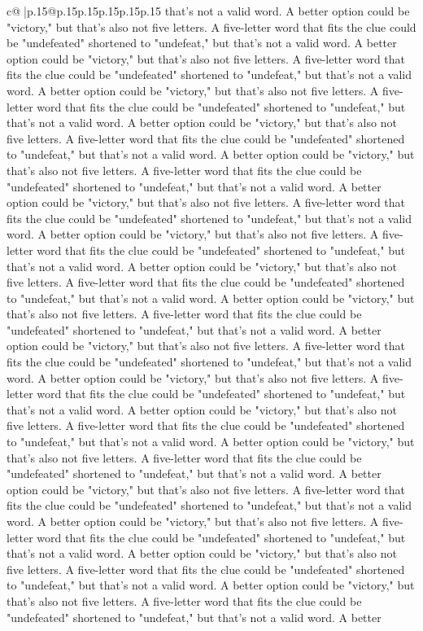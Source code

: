 \documentclass{article}
\begin{document}
{\begin{supertabular}{c@{$\;$}|p{.15\linewidth}@{}p{.15\linewidth}p{.15\linewidth}p{.15\linewidth}p{.15\linewidth}p{.15\linewidth}}
{{{that's not a valid word. A better option could be "victory," but that's also not five letters. A five{-}letter word that fits the clue could be "undefeated" shortened to "undefeat," but that's not a valid word. A better option could be "victory," but that's also not five letters. A five{-}letter word that fits the clue could be "undefeated" shortened to "undefeat," but that's not a valid word. A better option could be "victory," but that's also not five letters. A five{-}letter word that fits the clue could be "undefeated" shortened to "undefeat," but that's not a valid word. A better option could be "victory," but that's also not five letters. A five{-}letter word that fits the clue could be "undefeated" shortened to "undefeat," but that's not a valid word. A better option could be "victory," but that's also not five letters. A five{-}letter word that fits the clue could be "undefeated" shortened to "undefeat," but that's not a valid word. A better option could be "victory," but that's also not five letters. A five{-}letter word that fits the clue could be "undefeated" shortened to "undefeat," but that's not a valid word. A better option could be "victory," but that's also not five letters. A five{-}letter word that fits the clue could be "undefeated" shortened to "undefeat," but that's not a valid word. A better option could be "victory," but that's also not five letters. A five{-}letter word that fits the clue could be "undefeated" shortened to "undefeat," but that's not a valid word. A better option could be "victory," but that's also not five letters. A five{-}letter word that fits the clue could be "undefeated" shortened to "undefeat," but that's not a valid word. A better option could be "victory," but that's also not five letters. A five{-}letter word that fits the clue could be "undefeated" shortened to "undefeat," but that's not a valid word. A better option could be "victory," but that's also not five letters. A five{-}letter word that fits the clue could be "undefeated" shortened to "undefeat," but that's not a valid word. A better option could be "victory," but that's also not five letters. A five{-}letter word that fits the clue could be "undefeated" shortened to "undefeat," but that's not a valid word. A better option could be "victory," but that's also not five letters. A five{-}letter word that fits the clue could be "undefeated" shortened to "undefeat," but that's not a valid word. A better option could be "victory," but that's also not five letters. A five{-}letter word that fits the clue could be "undefeated" shortened to "undefeat," but that's not a valid word. A better option could be "victory," but that's also not five letters. A five{-}letter word that fits the clue could be "undefeated" shortened to "undefeat," but that's not a valid word. A better option could be "victory," but that's also not five letters. A five{-}letter word that fits the clue could be "undefeated" shortened to "undefeat," but that's not a valid word. A better option could be "victory," but that's also not five letters. A five{-}letter word that fits the clue could be "undefeated" shortened to "undefeat," but that's not a valid word. A better }}}
\end{supertabular}}
\end{document}

